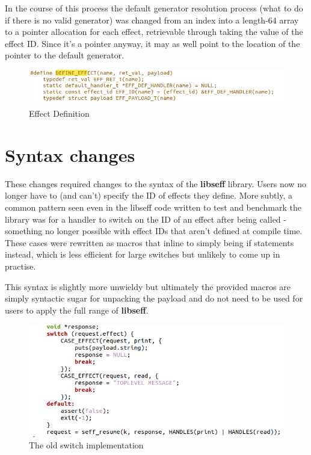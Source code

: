 \documentclass[logo,bsc,singlespacing,parskip,online]{infthesis}
\begin{document}
In the course of this process the default generator resolution process (what to do if there is no valid generator) was changed from an index into a length-64 array to a pointer allocation for each effect, retrievable through taking the value of the effect ID. Since it's a pointer anyway, it may as well point to the location of the pointer to the default generator.

\begin{figure}[h]
    \centering
    \includegraphics[width=1\linewidth]{defeff.png}
    \caption{Effect Definition}
    \label{fig:joooo}
\end{figure}

\section{Syntax changes}

These changes required changes to the syntax of the \textbf{libseff} library. Users now no longer have to (and can't) specify the ID of effects they define. More subtly, a common pattern seen even in the libseff code written to test and benchmark the library was for a handler to switch on the ID of an effect after being called - something no longer possible with effect IDs that aren't defined at compile time. These cases were rewritten as macros that inline to simply being if statements instead, which is less efficient for large switches but unlikely to come up in practise.

This syntax is slightly more unwieldy but ultimately the provided macros are simply syntactic sugar for unpacking the payload and do not need to be used for users to apply the full range of \textbf{libseff}.

\begin{figure}[h]
    \centering
    \includegraphics[width=1\linewidth]{oldswitch.png}
    \caption{The old switch implementation}
    \label{fig:oldswitch}
\end{figure}
\end{document}
